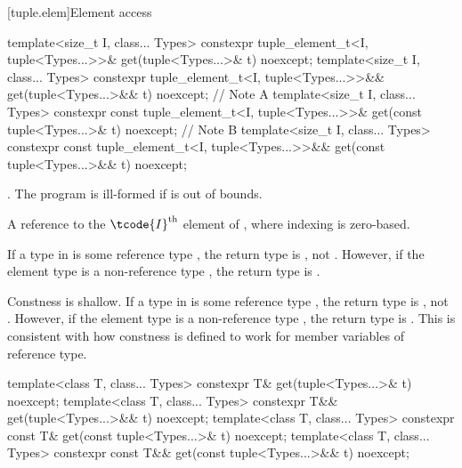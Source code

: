 [tuple.elem]{Element access}

%
\begin{itemdecl}
template<size_t I, class... Types>
  constexpr tuple_element_t<I, tuple<Types...>>&
    get(tuple<Types...>& t) noexcept;
template<size_t I, class... Types>
  constexpr tuple_element_t<I, tuple<Types...>>&&
    get(tuple<Types...>&& t) noexcept;        // Note A
template<size_t I, class... Types>
  constexpr const tuple_element_t<I, tuple<Types...>>&
    get(const tuple<Types...>& t) noexcept;   // Note B
template<size_t I, class... Types>
  constexpr const tuple_element_t<I, tuple<Types...>>&& get(const tuple<Types...>&& t) noexcept;
\end{itemdecl}

\begin{itemdescr}
\pnum
\requires {}.
The program is ill-formed if  is out of bounds.

\pnum
\returns
A reference to the $\tcode{I}^\text{th}$ element of , where
indexing is zero-based.

\pnum
\begin{note}
[Note A]
If a type  in  is some reference type ,
the return type is , not .
However, if the element type is a non-reference type ,
the return type is .
\end{note}

\pnum
\begin{note}
[Note B]
Constness is shallow.
If a type  in  is some reference type ,
the return type is , not .
However, if the element type is a non-reference type ,
the return type is .
This is consistent with how constness is defined to work
for member variables of reference type.
\end{note}
\end{itemdescr}

%
\begin{itemdecl}
template<class T, class... Types>
  constexpr T& get(tuple<Types...>& t) noexcept;
template<class T, class... Types>
  constexpr T&& get(tuple<Types...>&& t) noexcept;
template<class T, class... Types>
  constexpr const T& get(const tuple<Types...>& t) noexcept;
template<class T, class... Types>
  constexpr const T&& get(const tuple<Types...>&& t) noexcept;
\end{itemdecl}

